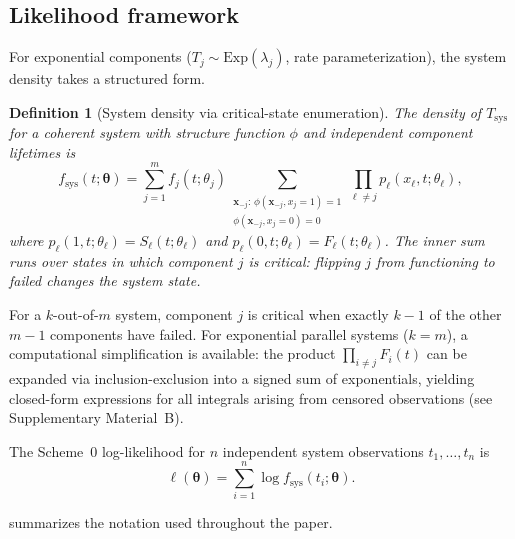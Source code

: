 \documentclass[12pt]{article}
\newtheorem{definition}{Definition}
\newcommand{\Tsys}{T_{\mathrm{sys}}}
\newcommand{\fsys}{f_{\mathrm{sys}}}
\newcommand{\btheta}{\boldsymbol{\theta}}
\newcommand{\bx}{\mathbf{x}}
\begin{document}
\subsection{Likelihood framework}\label{sec:likelihood}

For exponential components ($T_j \sim \text{Exp}(\lambda_j)$, rate
parameterization), the system density takes a structured form.

\begin{definition}[System density via critical-state enumeration]
\label{def:fsys}
The density of $\Tsys$ for a coherent system with structure function $\phi$
and independent component lifetimes is
\begin{equation}\label{eq:fsys}
  \fsys(t; \btheta) = \sum_{j=1}^{m} f_j(t; \theta_j)
    \!\!\sum_{\substack{\bx_{-j}:\, \phi(\bx_{-j}, x_j\!=\!1)=1 \\
    \phi(\bx_{-j}, x_j\!=\!0)=0}}
    \prod_{\ell \neq j} p_\ell(x_\ell, t; \theta_\ell),
\end{equation}
where $p_\ell(1, t; \theta_\ell) = S_\ell(t; \theta_\ell)$ and
$p_\ell(0, t; \theta_\ell) = F_\ell(t; \theta_\ell)$.  The inner sum runs
over states in which component $j$ is \emph{critical}: flipping $j$ from
functioning to failed changes the system state.
\end{definition}

For a $k$-out-of-$m$ system, component $j$ is critical when exactly $k - 1$
of the other $m - 1$ components have failed.  For exponential parallel
systems ($k = m$), a computational simplification is available: the product
$\prod_{i \neq j} F_i(t)$ can be expanded via inclusion-exclusion into a
signed sum of exponentials, yielding closed-form expressions for all
integrals arising from censored observations
(see Supplementary Material~B).

The Scheme~0 log-likelihood for $n$ independent system observations
$t_1, \ldots, t_n$ is
\begin{equation}\label{eq:scheme0-ll}
  \ell(\btheta) = \sum_{i=1}^{n} \log \fsys(t_i; \btheta).
\end{equation}

 summarizes the notation used throughout the paper.
\end{document}
